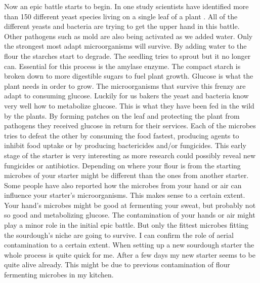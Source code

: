 Now an epic battle starts to begin. In one study scientists
have identified more than 150 different yeast species living
on a single leaf of a plant \cite{yeasts+biocontrol+agent}.
All of the different yeasts and bacteria are trying to get
the upper hand in this battle. Other pathogens such as mold
are also being activated as we added water. Only the strongest
most adapt microorganisms will survive. By adding water to the
flour the starches start to degrade. The seedling tries to
sprout but it no longer can. Essential for this process is the
amylase enzyme. The compact starch is broken down to more
digestible sugars to fuel plant growth. Glucose is what the
plant needs in order to grow. The microorganisms that survive
this frenzy are adapt to consuming glucose. Luckily for us
bakers the yeast and bacteria know very well how to metabolize
glucose. This is what they have been fed in the wild by the plants.
By forming patches on the leaf and protecting the plant from 
pathogens they received glucose in return for their services.
Each of the microbes tries to defeat the other by consuming the
food fastest, producing agents to inhibit food uptake or by producing
bactericides and/or fungicides. This early stage of the starter
is very interesting as more research could possibly reveal
new fungicides or antibiotics. Depending on where your flour
is from the starting microbes of your starter might be different
than the ones from another starter. Some people have also reported
how the microbes from your hand or air can influence your starter's
microorganisms. This makes sense to a certain extent. Your
hand's microbes might be good at fermenting your sweat, but
probably not so good and metabolizing glucose. The contamination
of your hands or air might play a minor role in the initial epic
battle. But only the fittest microbes fitting the sourdough's
niche are going to survive. I can confirm the role of aerial
contamination to a certain extent. When setting up a new sourdough
starter the whole process is quite quick for me. After a few
days my new starter seems to be quite alive already. This might
be due to previous contamination of flour fermenting microbes in
my kitchen.


